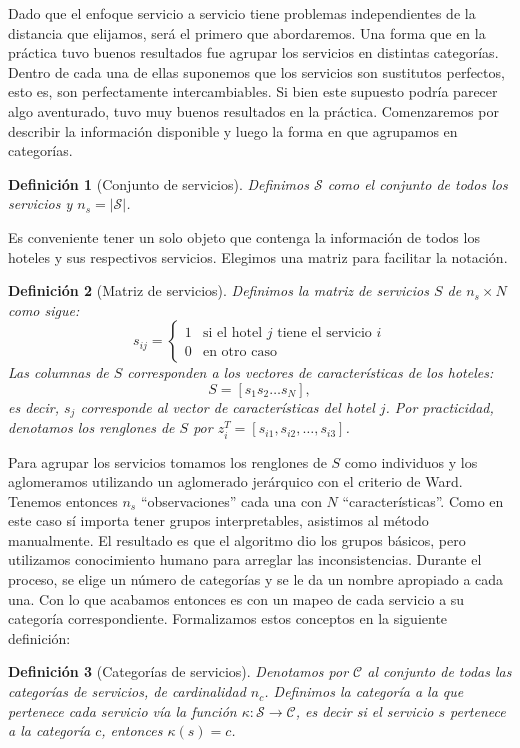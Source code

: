 \documentclass[12pt]{report}
\newtheorem{defn}{Definici\'on}[chapter]
\begin{document}
Dado que el enfoque servicio a servicio tiene problemas independientes de la distancia que elijamos, será el primero que abordaremos. Una forma que en la práctica tuvo buenos resultados fue agrupar los servicios en distintas categorías. Dentro de cada una de ellas suponemos que los servicios son sustitutos perfectos, esto es, son perfectamente intercambiables. Si bien este supuesto podría parecer algo aventurado, tuvo muy buenos resultados en la práctica. Comenzaremos por describir la información disponible y luego la forma en que agrupamos en categorías.
\begin{defn}[Conjunto de servicios]
Definimos $\mathcal{S}$ como el conjunto de todos los servicios y $n_s = |\mathcal{S}|$.
\end{defn}
Es conveniente tener un solo objeto que contenga la información de todos los hoteles y sus respectivos servicios. Elegimos una matriz para facilitar la notación.
\begin{defn}[Matriz de servicios]
Definimos la matriz de servicios $S$ de $n_s \times N$ como sigue:
\[
s_{ij} = \left\{
\begin{array}{ll}
1 & \text{si el hotel $j$ tiene el servicio $i$}\\
0 & \text{en otro caso}
\end{array}
\right.
\]
Las columnas de $S$ corresponden a los vectores de características de los hoteles:
\[
S = [s_1 s_2 \dots s_N],
\]
es decir, $s_j$ corresponde al vector de características del hotel $j$. Por practicidad, denotamos los renglones de $S$ por $z_i^T = [s_{i1}, s_{i2}, \dots, s_{i3}]$.
\end{defn}
Para agrupar los servicios tomamos los renglones de $S$ como individuos y los aglomeramos utilizando un aglomerado jerárquico con el criterio de Ward. Tenemos entonces $n_s$ ``observaciones'' cada una con $N$ ``características''. Como en este caso sí importa tener grupos interpretables, asistimos al método manualmente. El resultado es que el algoritmo dio los grupos básicos, pero utilizamos conocimiento humano para arreglar las inconsistencias. Durante el proceso, se elige un número de categorías y se le da un nombre apropiado a cada una. Con lo que acabamos entonces es con un mapeo de cada servicio a su categoría correspondiente. Formalizamos estos conceptos en la siguiente definición:
\begin{defn}[Categorías de servicios]
Denotamos por $\mathcal{C}$ al conjunto de todas las categorías de servicios, de cardinalidad $n_c$. Definimos la categoría a la que pertenece cada servicio vía la función $\kappa: \mathcal{S} \to \mathcal{C}$, es decir si el servicio $s$ pertenece a la categoría $c$, entonces $\kappa(s) = c$.
\end{defn}
\end{document}
